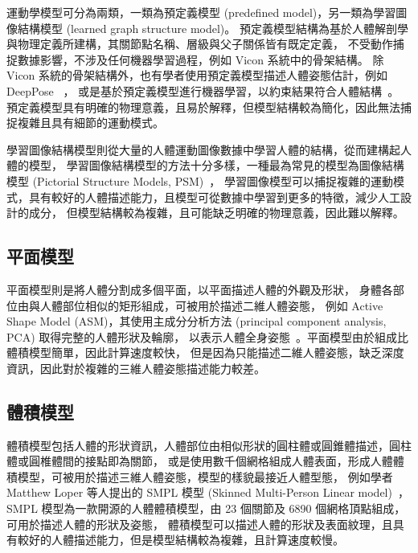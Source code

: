 運動學模型可分為兩類，一類為預定義模型 (predefined model)，另一類為學習圖像結構模型 (learned graph structure model)。
預定義模型結構為基於人體解剖學與物理定義所建構，其關節點名稱、層級與父子關係皆有既定定義，
不受動作捕捉數據影響，不涉及任何機器學習過程，例如 Vicon 系統中的骨架結構。
除 Vicon 系統的骨架結構外，也有學者使用預定義模型描述人體姿態估計，例如 DeepPose ~\cite{Toshev_2014_CVPR}，
或是基於預定義模型進行機器學習，以約束結果符合人體結構~\cite{wei2016convolutional}。
預定義模型具有明確的物理意義，且易於解釋，但模型結構較為簡化，因此無法捕捉複雜且具有細節的運動模式。

學習圖像結構模型則從大量的人體運動圖像數據中學習人體的結構，從而建構起人體的模型，
學習圖像結構模型的方法十分多樣，一種最為常見的模型為圖像結構模型 (Pictorial Structure Models, PSM)~\cite{johnson2010clustered}，
學習圖像模型可以捕捉複雜的運動模式，具有較好的人體描述能力，且模型可從數據中學習到更多的特徵，減少人工設計的成分，
但模型結構較為複雜，且可能缺乏明確的物理意義，因此難以解釋。

\subsection*{平面模型}
平面模型則是將人體分割成多個平面，以平面描述人體的外觀及形狀，
身體各部位由與人體部位相似的矩形組成，可被用於描述二維人體姿態，
例如 Active Shape Model (ASM)，其使用主成分分析方法 (principal component analysis, PCA) 取得完整的人體形狀及輪廓，
以表示人體全身姿態~\cite{freifeld2010contour}。平面模型由於組成比體積模型簡單，因此計算速度較快，
但是因為只能描述二維人體姿態，缺乏深度資訊，因此對於複雜的三維人體姿態描述能力較差。

\subsection*{體積模型}
體積模型包括人體的形狀資訊，人體部位由相似形狀的圓柱體或圓錐體描述，圓柱體或圓椎體間的接點即為關節，
或是使用數千個網格組成人體表面，形成人體體積模型，可被用於描述三維人體姿態，模型的樣貌最接近人體型態，
例如學者 Matthew Loper 等人提出的 SMPL 模型 (Skinned Multi-Person Linear model)~\cite{SMPL:2015}，
SMPL 模型為一款開源的人體體積模型，由 23 個關節及 6890 個網格頂點組成，可用於描述人體的形狀及姿態，
體積模型可以描述人體的形狀及表面紋理，且具有較好的人體描述能力，但是模型結構較為複雜，且計算速度較慢。

